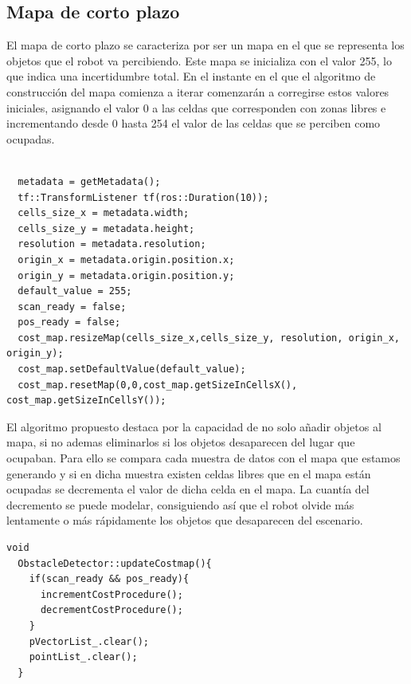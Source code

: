\subsection{Mapa de corto plazo}
El mapa de corto plazo se caracteriza por ser un mapa en el que se representa los objetos que el robot va percibiendo. Este mapa se inicializa con el valor 255, lo que indica una incertidumbre total. En el instante en el que el algoritmo de construcción del mapa comienza a iterar comenzarán a corregirse estos valores iniciales, asignando el valor 0 a las celdas que corresponden con zonas libres e incrementando desde 0 hasta 254 el valor de las celdas que se perciben como ocupadas. \pagebreak

\renewcommand{\lstlistingname}{Código}
\begin{lstlisting}[caption=Inicialización del cost\_map correspondiente al mapa de corto plazo, label={lst:initcostmap}]

  metadata = getMetadata();
  tf::TransformListener tf(ros::Duration(10));
  cells_size_x = metadata.width;
  cells_size_y = metadata.height;
  resolution = metadata.resolution;
  origin_x = metadata.origin.position.x;
  origin_y = metadata.origin.position.y;
  default_value = 255;
  scan_ready = false;
  pos_ready = false;
  cost_map.resizeMap(cells_size_x,cells_size_y, resolution, origin_x, origin_y);
  cost_map.setDefaultValue(default_value);
  cost_map.resetMap(0,0,cost_map.getSizeInCellsX(), cost_map.getSizeInCellsY());
\end{lstlisting}


El algoritmo propuesto destaca por la capacidad de no solo añadir objetos al mapa, si no ademas eliminarlos si los objetos desaparecen del lugar que ocupaban. Para ello se compara cada muestra de datos con el mapa que estamos generando y si en dicha muestra existen celdas libres que en el mapa están ocupadas se decrementa el valor de dicha celda en el mapa. La cuantía del decremento se puede modelar, consiguiendo así que el robot olvide más lentamente o más rápidamente los objetos que desaparecen del escenario.\\

\renewcommand{\lstlistingname}{Código}
\begin{lstlisting}[caption=Función que actualiza el mapa en cada iteración, label={lst:updatecostmap}]
  void
  ObstacleDetector::updateCostmap(){
    if(scan_ready && pos_ready){
      incrementCostProcedure();
      decrementCostProcedure();
    }
    pVectorList_.clear();
    pointList_.clear();
  }
\end{lstlisting}

